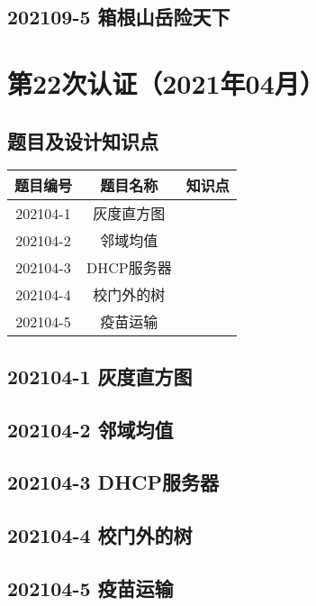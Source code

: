 \documentclass[cn,10pt,math=newtx,citestyle=gb7714-2015,bibstyle=gb7714-2015]{elegantbook}
\newif\ifonlyanalyze %
\begin{document}
\newpage
\section{202109-5 箱根山岳险天下}
\ifonlyanalyze
\else
  
\fi



\chapter{第22次认证（2021年04月）}

\section{题目及设计知识点}

\begin{table}[htbp]
  \centering
  \begin{tabular}{ccc}
    \toprule
    题目编号 & 题目名称   & 知识点 \\
    \midrule
    202104-1 & 灰度直方图 &        \\
    202104-2 & 邻域均值   &        \\
    202104-3 & DHCP服务器 &        \\
    202104-4 & 校门外的树 &        \\
    202104-5 & 疫苗运输   &        \\
    \bottomrule
  \end{tabular}
\end{table}

\newpage
\section{202104-1 灰度直方图}
\ifonlyanalyze
\else
  
\fi


\newpage
\section{202104-2 邻域均值}
\ifonlyanalyze
\else
  
\fi


\newpage
\section{202104-3 DHCP服务器}
\ifonlyanalyze
\else
  
\fi


\newpage
\section{202104-4 校门外的树}
\ifonlyanalyze
\else
  
\fi


\newpage
\section{202104-5 疫苗运输}
\ifonlyanalyze
\else
  
\fi

\end{document}
